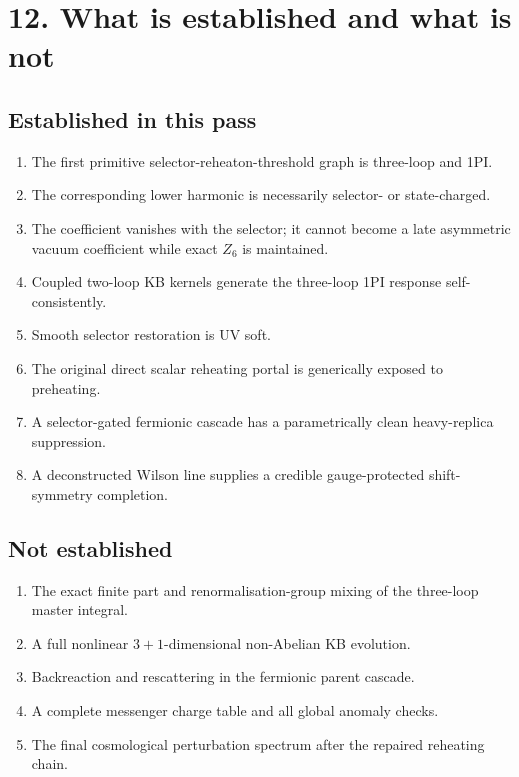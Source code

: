 \documentclass[
  10pt,
]{article}
\providecommand{\tightlist}{%
  \setlength{\itemsep}{0pt}\setlength{\parskip}{0pt}}
\begin{document}
\section{12. What is established and what is
not}\label{what-is-established-and-what-is-not}

\subsection{Established in this pass}\label{established-in-this-pass}

\begin{enumerate}
\def\labelenumi{\arabic{enumi}.}
\tightlist
\item
  The first primitive selector-reheaton-threshold graph is three-loop
  and 1PI.
\item
  The corresponding lower harmonic is necessarily selector- or
  state-charged.
\item
  The coefficient vanishes with the selector; it cannot become a late
  asymmetric vacuum coefficient while exact \(Z_6\) is maintained.
\item
  Coupled two-loop KB kernels generate the three-loop 1PI response
  self-consistently.
\item
  Smooth selector restoration is UV soft.
\item
  The original direct scalar reheating portal is generically exposed to
  preheating.
\item
  A selector-gated fermionic cascade has a parametrically clean
  heavy-replica suppression.
\item
  A deconstructed Wilson line supplies a credible gauge-protected
  shift-symmetry completion.
\end{enumerate}

\subsection{Not established}\label{not-established}

\begin{enumerate}
\def\labelenumi{\arabic{enumi}.}
\tightlist
\item
  The exact finite part and renormalisation-group mixing of the
  three-loop master integral.
\item
  A full nonlinear \(3+1\)-dimensional non-Abelian KB evolution.
\item
  Backreaction and rescattering in the fermionic parent cascade.
\item
  A complete messenger charge table and all global anomaly checks.
\item
  The final cosmological perturbation spectrum after the repaired
  reheating chain.
\end{enumerate}
\end{document}
